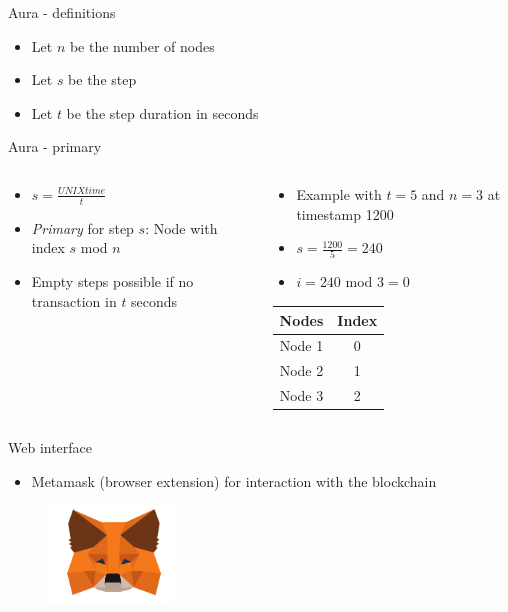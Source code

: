 \documentclass[10pt]{beamer}
\begin{document}
\begin{frame}{Aura - definitions}
	\begin{itemize}
		\item Let $n$ be the number of nodes
		\item Let $s$ be the step
		\item Let $t$ be the step duration in seconds
	\end{itemize}
\end{frame}

\begin{frame}{Aura - primary}
	\begin{columns}
		\begin{column}{0.48\textwidth}
			\begin{itemize}
				\item $s = \frac{UNIXtime}{t}$
				\item \textit{Primary} for step $s$: Node with index $s$ mod $n$
				\item Empty steps possible if no transaction in $t$ seconds
			\end{itemize}
		\end{column}
		\begin{column}{0.48\textwidth}
			\begin{itemize}
				\item Example with $t = 5$ and $n = 3$ at timestamp 1200
				\item $s = \frac{1200}{5} = 240$
				\item $i = 240$ mod $3 = 0$
			\end{itemize}
			\vspace{5mm}
			\begin{tabular}{ | c | c | }
				\hline
				Nodes & Index \\\hline
				\cellcolor{green} Node 1 & \cellcolor{green} 0 \\\hline
				Node 2 & 1 \\\hline
				Node 3 & 2 \\
				\hline
			\end{tabular}
		\end{column}
	\end{columns}
\end{frame}

\begin{frame}{Web interface}
	\begin{itemize}
		\item Metamask (browser extension) for interaction with the blockchain
	\end{itemize}
	\begin{figure}
		\includegraphics[width=0.3\textwidth]{images/mm-logo.png}
	\end{figure}
\end{frame}
\end{document}
